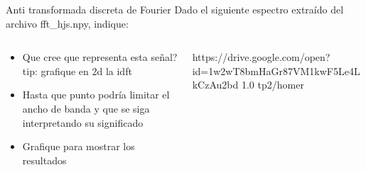  \begin{frame}{Anti transformada discreta de Fourier}
  Dado el siguiente espectro extraído del archivo fft\_hjs.npy, indique:
   \begin{columns}[c]
      \hspace{2pt}
      \begin{column}{.6\textwidth}
    \begin{itemize}
       \item{Que cree que representa esta señal?  \footnotesize{tip: grafique en 2d la idft}}
       \item{Hasta que punto podría limitar el ancho de banda y que se siga interpretando su significado}
       \item{Grafique para mostrar los resultados}
    \end{itemize}
      \end{column}
      \hspace{2pt}
      \vrule
      \hspace{2pt}
      \begin{column}{.4\textwidth}
         {https://drive.google.com/open?id=1w2wT8bmHaGr87VM1kwF5Le4LkCzAu2bd}
         {1.0}
         {tp2/homer}
      \end{column}
      \hspace{2pt}
   \end{columns}
    \vfill
 \end{frame}
